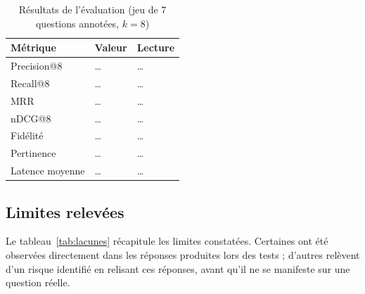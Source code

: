 \begin{table}[h]
\centering
\caption{Résultats de l'évaluation (jeu de 7 questions annotées, $k = 8$)}
\label{tab:resultats-eval}
\begin{tabular}{|p{3.3cm}|p{2.6cm}|p{7.7cm}|}
\hline
\textbf{Métrique} & \textbf{Valeur} & \textbf{Lecture} \\
\hline
Precision@8 & \dots & \dots \\
\hline
Recall@8 & \dots & \dots \\
\hline
MRR & \dots & \dots \\
\hline
nDCG@8 & \dots & \dots \\
\hline
Fidélité & \dots & \dots \\
\hline
Pertinence & \dots & \dots \\
\hline
Latence moyenne & \dots & \dots \\
\hline
\end{tabular}
\end{table}

\subsection{Limites relevées}

Le tableau~\ref{tab:lacunes} récapitule les limites constatées. Certaines ont été
observées directement dans les réponses produites lors des tests ; d'autres
relèvent d'un risque identifié en relisant ces réponses, avant qu'il ne se
manifeste sur une question réelle.

